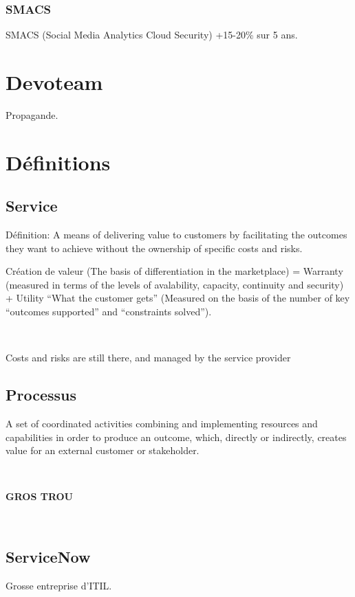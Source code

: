 \documentclass[a4paper,11pt]{article}
\begin{document}
\subsubsection{SMACS}

SMACS (Social Media Analytics Cloud Security) +15-20\% sur 5 ans.

\section{Devoteam}

Propagande.

\section{Définitions}

\subsection{Service}

Définition: A means of delivering value to customers by facilitating the
outcomes they want to achieve without the ownership of specific costs and risks.

Création de valeur (The basis of differentiation in the marketplace) =
Warranty (measured in terms of the levels of avalability, capacity, continuity
and security) + Utility ``What the customer gets'' (Measured on the basis of the
number of key ``outcomes supported'' and ``constraints solved'').

\

Costs and risks are still there, and managed by the service provider

\subsection{Processus}

A set of coordinated activities combining and implementing resources and
capabilities in order to produce an outcome, which, directly or indirectly,
creates value for an external customer or stakeholder.

\

\textbf{GROS TROU}

\

\subsection{ServiceNow}

Grosse entreprise d'ITIL.
\end{document}
